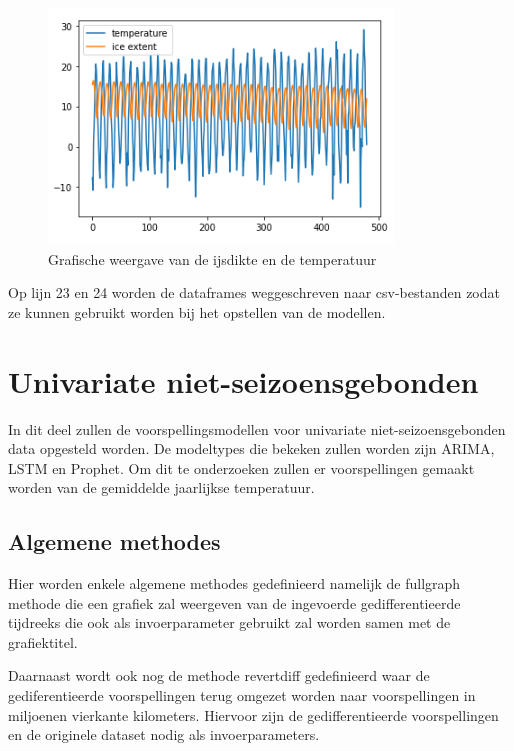 \begin{figure}
    \centering
    \caption{Grafische weergave van de ijsdikte en de temperatuur}
    \label{fig:combinedmonths}
    \includegraphics[width=0.7\linewidth]{combined_months.PNG}
\end{figure}

Op lijn 23 en 24 worden de dataframes weggeschreven naar csv-bestanden zodat ze kunnen gebruikt worden bij het opstellen van de modellen.


\section{Univariate niet-seizoensgebonden}

In dit deel zullen de voorspellingsmodellen voor univariate niet-seizoensgebonden data opgesteld worden. De modeltypes die bekeken zullen worden zijn ARIMA, LSTM en Prophet. Om dit te onderzoeken zullen er voorspellingen gemaakt worden van de gemiddelde jaarlijkse temperatuur.

\subsection{Algemene methodes}

Hier worden enkele algemene methodes gedefinieerd namelijk de full\textunderscore graph methode die een grafiek zal weergeven van de ingevoerde gedifferentieerde tijdreeks die ook als invoerparameter gebruikt zal worden samen met de grafiektitel.

Daarnaast wordt ook nog de methode revert\textunderscore diff gedefinieerd waar de gediferentieerde voorspellingen terug omgezet worden naar voorspellingen in miljoenen vierkante kilometers. Hiervoor zijn de gedifferentieerde voorspellingen en de originele dataset nodig als invoerparameters.

